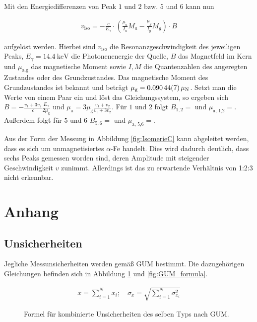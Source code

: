 \documentclass[
a4paper,                %
titlepage=firstiscover, %
captions=tableheading,  %
toc=bibliography,       %
toc=listof,             %
oneside,                %
automark,               %
12pt,                   %
english, ngerman,       %
parskip = half,         %
]{scrartcl}
\begin{document}
Mit den Energiedifferenzen von Peak $1$ und $2$ bzw. $5$ und $6$ kann nun

\begin{align}
v_\text{iso} = - \frac{c}{E_\gamma}\cdot\left(\frac{\mu_a}{I_a}M_a - \frac{\mu_g}{I_g}M_g \right)\cdot B
\end{align}

\noindent aufgelöst werden.
Hierbei sind $v_\text{iso}$ die Resonanzgeschwindigkeit des jeweiligen Peaks, $E_\gamma = \SI{14,4}{\kilo\electronvolt}$ die Photonenenergie der Quelle, $B$ das Magnetfeld im Kern und $\mu_\text{a,g}$ das magnetische Moment sowie $I,M$ die Quantenzahlen des angeregten Zustandes oder des Grundzustandes.
Das magnetische Moment des Grundzustandes ist bekannt und beträgt $\mu_\text{g} = \SI{0,09044 \pm 0,00007}{\mu_N}$.
Setzt man die Werte von einem Paar ein und löst das Gleichungssystem, so ergeben sich $B = -\frac{v_1 + 3 v_2}{c} \frac{E_\gamma}{2 \mu_\text{g}}$ und $\mu_\text{a} = 3 \mu_\text{g} \frac{v_1+v_2}{v_1 + 3 v_2}$.
Für $1$ und $2$ folgt $B_{1,2} = $ und $\mu_\text{a, 1,2} = $.
Außerdem folgt für $5$ und $6$ $B_{5,6} = $ und $\mu_\text{a, 5,6} = $.

Aus der Form der Messung in Abbildung \ref{fig:IsomerieC} kann abgeleitet werden, dass es sich um unmagnetisiertes $\alpha$-Fe handelt.
Dies wird dadurch deutlich, dass sechs Peaks gemessen worden sind, deren Amplitude mit steigender Geschwindigkeit $v$ zunimmt.
Allerdings ist das zu erwartende Verhältnis von 1:2:3 nicht erkennbar.


\newpage


\section{Anhang} \label{Anhang}

\subsection*{Unsicherheiten}

Jegliche Messunsicherheiten werden gemäß GUM\cite{1} bestimmt.
Die dazugehörigen Gleichungen befinden sich in Abbildung \ref{fig:GUM_combine} und \ref{fig:GUM_formula}.

\begin{figure}[H]
	\centering
	\begin{align*}
	x = \sum_{i=1}^{N} x_i
	;\quad
	\sigma_x = \sqrt{\sum_{i = 1}^{N} \sigma_{x_i}^2}
	\end{align*}
	\caption{Formel für kombinierte Unsicherheiten des selben Typs nach GUM.}
	\label{fig:GUM_combine}
\end{figure}
\end{document}
